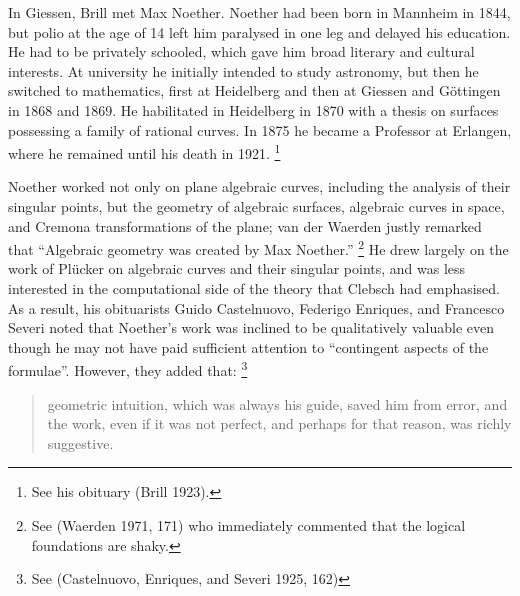 In Giessen, Brill met Max Noether.
%
 Noether had been born in Mannheim
in 1844, but polio at the age of 14 left him paralysed in one leg and
delayed his education. He had to be privately schooled, which gave
him  broad literary and cultural interests. At university he  initially
intended to study astronomy, but then he switched to mathematics, first
at Heidelberg
%
and then at Giessen and G\"ottingen
%
in 1868 and 1869. He
habilitated in Heidelberg in 1870 with a thesis on surfaces possessing
a family of rational curves. In 1875 he became a Professor at Erlangen,
%
where he remained until his death in 1921.%
%
\footnote{See his obituary
(Brill 1923).}


Noether  worked not only on plane algebraic curves, including the analysis
of their singular points, but the geometry of algebraic surfaces,
algebraic curves in space, and Cremona transformations
%
of the plane;
van der Waerden justly remarked that ``Algebraic geometry
%
was created by
Max Noether.''%
%
\footnote{See (Waerden 1971, 171) who immediately commented
that the logical foundations are shaky.}
%
He drew largely on the work of Pl\"ucker
%
on algebraic curves and their
singular points, and was less interested in the computational side of the
theory that Clebsch had emphasised. As a result, his obituarists\emdash
Guido Castelnuovo,
%
 Federigo Enriques,
%
 and Francesco Severi\emdash
{}%
noted
that Noether's work was inclined to be qualitatively valuable even though
he may not have paid sufficient attention to ``contingent aspects of
the formulae''.  However, they added that:%
%
\footnote{See (Castelnuovo,
Enriques, and Severi 1925, 162)}
%
\begin{quote}
geometric intuition, which was always his guide, saved him from error,
and the work, even if it was not perfect, and perhaps for that reason,
was richly suggestive.
\end{quote}



